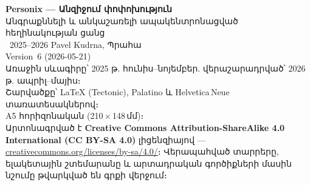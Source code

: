 \thispagestyle{empty}
\ifdefined\printmode\vspace*{\fill}\else{}\fi
\begin{flushleft}\small\sffamily
\textbf{Personix --- Անզիջում փոփոխություն}\\[0.3em]
Անգրաքննելի և անկաշառելի ապակենտրոնացված հեղինակության ցանց\\[1.4em]

\textcopyright\ 2025--2026 Pavel Kudrna, Պրահա\\[0.4em]

Version~6 (2026-05-21)\\
Առաջին սևագիրը՝ 2025 թ. հունիս–նոյեմբեր. վերաշարադրված՝ 2026 թ. ապրիլ–մայիս։\\[1.4em]

Շարվածքը՝ \LaTeX{} (Tectonic), Palatino և Helvetica\,Neue տառատեսակներով։\\
A5 հորիզոնական (210\,$\times$\,148\,մմ)։\\[1.4em]

Արտոնագրված է \textbf{Creative Commons Attribution-ShareAlike 4.0
International (CC BY-SA 4.0)} լիցենզիայով ---
\href{https://creativecommons.org/licenses/by-sa/4.0/}{creativecommons.org/licenses/by-sa/4.0/}։
Վերապահված տարրերը, ելակետային շտեմարանը և արտադրական գործիքների մասին
նշումը թվարկված են գրքի վերջում։
\end{flushleft}
\ifdefined\printmode\else{}\fi
\clearpage
